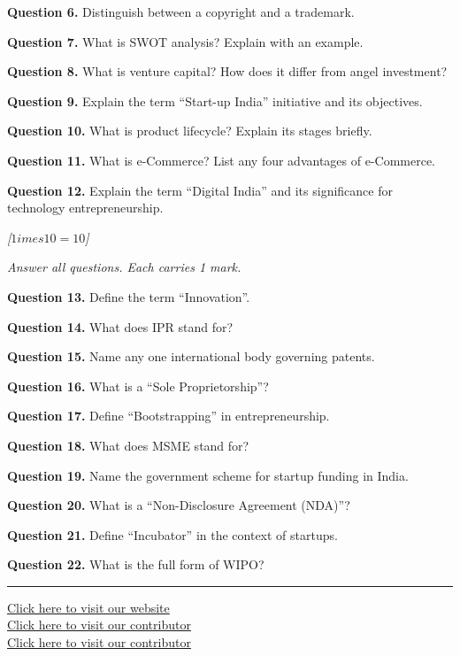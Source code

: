 \documentclass[11pt,a4paper]{article}
\newcommand{\pts}[1]{\hfill   \textit{[#1]}}
\begin{document}
\noindent   \textbf{Question 6.} Distinguish between a copyright and a trademark.
\medskip


\noindent   \textbf{Question 7.} What is SWOT analysis? Explain with an example.
\medskip


\noindent   \textbf{Question 8.} What is venture capital? How does it differ from angel investment?
\medskip


\noindent   \textbf{Question 9.} Explain the term ``Start-up India'' initiative and its objectives.
\medskip


\noindent   \textbf{Question 10.} What is product lifecycle? Explain its stages briefly.
\medskip


\noindent   \textbf{Question 11.} What is e-Commerce? List any four advantages of e-Commerce.
\medskip


\noindent   \textbf{Question 12.} Explain the term ``Digital India'' and its significance for technology entrepreneurship.
\bigskip



\pts{$1 imes10=10$}
\medskip


\noindent   \textit{Answer all questions. Each carries 1 mark.}
\bigskip



\noindent   \textbf{Question 13.} Define the term ``Innovation''.
\medskip


\noindent   \textbf{Question 14.} What does IPR stand for?
\medskip


\noindent   \textbf{Question 15.} Name any one international body governing patents.
\medskip


\noindent   \textbf{Question 16.} What is a ``Sole Proprietorship''?
\medskip


\noindent   \textbf{Question 17.} Define ``Bootstrapping'' in entrepreneurship.
\medskip


\noindent   \textbf{Question 18.} What does MSME stand for?
\medskip


\noindent   \textbf{Question 19.} Name the government scheme for startup funding in India.
\medskip


\noindent   \textbf{Question 20.} What is a ``Non-Disclosure Agreement (NDA)''?
\medskip


\noindent   \textbf{Question 21.} Define ``Incubator'' in the context of startups.
\medskip


\noindent   \textbf{Question 22.} What is the full form of WIPO?
\vfill
\rule{\linewidth}{0.4pt}

\begin{center}\small
\href{https://bhu-exam.vercel.app/}{Click here to visit our website}\\[4pt]\href{https://me-aryan.vercel.app/}{Click here to visit our contributor}\\[4pt]\href{https://quashan-me.vercel.app/}{Click here to visit our contributor}
\end{center}
\end{document}
